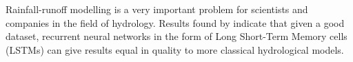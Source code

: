 Rainfall-runoff modelling is a very important problem for scientists and 
companies in the field of hydrology.
Results found by \cite{lstm_first_paper} indicate that given a good dataset, recurrent neural networks in the form of Long Short-Term Memory cells (LSTMs) can give results equal in quality to more classical hydrological models.
\cite{lstm_second_paper}
\cite{lstm_third_paper}
